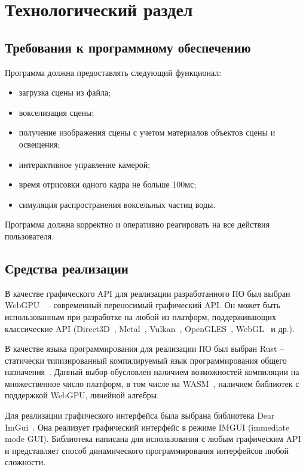 \chapter{Технологический раздел}

\section{Требования к программному обеспечению}

Программа должна предоставлять следующий функционал:
\begin{itemize}[label*=---]
    \item загрузка сцены из файла;
    \item вокселизация сцены;
    \item получение изображения сцены с учетом материалов объектов сцены и освещения;
    \item интерактивное управление камерой;
    \item время отрисовки одного кадра не больше 100мс;
    \item симуляция распространения воксельных частиц воды.
\end{itemize}

Программа должна корректно и оперативно реагировать на все действия пользователя.

\section{Средства реализации}

В качестве графического API для реализации разработанного ПО 
был выбран WebGPU~\cite{WebGPU} -- современный переносимый графический
API.
Он может быть использованным при разработке на любой из платформ, 
поддерживающих классические API (Direct3D~\cite{DirectX12}, 
Metal~\cite{Metal}, Vulkan~\cite{Vulkan}, OpenGLES~\cite{OpenGLES}, WebGL~\cite{WebGL} и др.).

В качестве языка программирования для реализации ПО был выбран Rust -- 
статически типизированный компилируемый язык программирования общего назначения~\cite{Rust}.
Данный выбор обусловлен наличием возможностей 
компиляции на множественное число платформ, в том числе на WASM~\cite{WASM}, наличием
библиотек с поддержкой WebGPU, линейной алгебры.

Для реализации графического интерфейса была выбрана библиотека Dear ImGui~\cite{ImGui}.
Она реализует графический интерфейс в режиме IMGUI (immediate mode GUI). Библиотека написана 
для использования с любым графическим API и представляет способ динамического 
программирования интерфейсов любой сложности.

